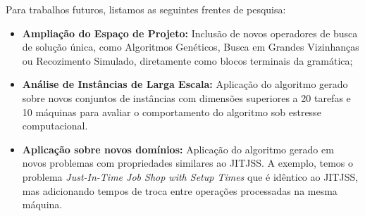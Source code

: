 Para trabalhos futuros, listamos as seguintes frentes de pesquisa:
\begin{itemize}
    \item \textbf{Ampliação do Espaço de Projeto:} Inclusão de novos operadores de busca de solução única, como Algoritmos Genéticos, Busca em Grandes Vizinhanças ou Recozimento Simulado, diretamente como blocos terminais da gramática;
    \item \textbf{Análise de Instâncias de Larga Escala:} Aplicação do algoritmo gerado sobre novos conjuntos de instâncias com dimensões superiores a 20 tarefas e 10 máquinas para avaliar o comportamento do algoritmo sob estresse computacional.
    \item \textbf{Aplicação sobre novos domínios:} Aplicação do algoritmo gerado em novos problemas com propriedades similares ao \ac{JITJSS}. A exemplo, temos o problema \textit{Just-In-Time Job Shop with Setup Times} que é idêntico ao \ac{JITJSS}, mas adicionando tempos de troca entre operações processadas na mesma máquina.
\end{itemize}
